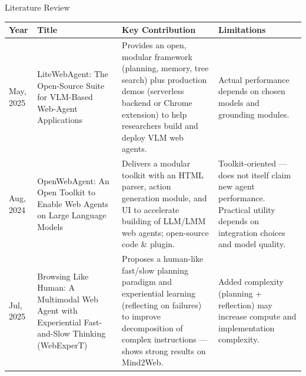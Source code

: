 \begin{frame}{Literature Review}
  \lrtable
  \begin{tabularx}{\textwidth}{p{0.7cm} p{2.8cm} X X}
    \toprule
    \textbf{Year} & \textbf{Title} & \textbf{Key Contribution} & \textbf{Limitations} \\
    \midrule
    May, 2025 \cite{zhang2025litewebagentopensourcesuitevlmbased}
    & LiteWebAgent: The Open-Source Suite for VLM-Based Web-Agent Applications
    & Provides an open, modular framework (planning, memory, tree search) plus production demos (serverless backend or Chrome extension) to help researchers build and deploy VLM web agents.
    & Actual performance depends on chosen models and grounding modules. \\
    \addlinespace
    Aug, 2024 \cite{iong2024openwebagent}
    & OpenWebAgent: An Open Toolkit to Enable Web Agents on Large Language Models
    & Delivers a modular toolkit with an HTML parser, action generation module, and UI to accelerate building of LLM/LMM web agents; open-source code \& plugin.
    & Toolkit-oriented --- does not itself claim new agent performance. Practical utility depends on integration choices and model quality. \\
    \addlinespace
    Jul, 2025 \cite{Browsinglikehuman:luo2025browsing}
    & Browsing Like Human: A Multimodal Web Agent with Experiential Fast-and-Slow Thinking (WebExperT)
    & Proposes a human-like fast/slow planning paradigm and experiential learning (reflecting on failures) to improve decomposition of complex instructions --- shows strong results on Mind2Web.
    & Added complexity (planning + reflection) may increase compute and implementation complexity. \\
    \bottomrule
  \end{tabularx}
\end{frame}
